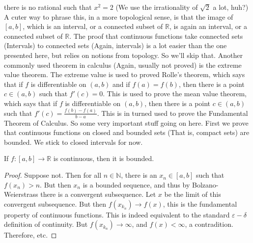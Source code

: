 \documentclass[crop=false,class=article,oneside]{standalone}
\begin{document}
            there is no rational such that $x^{2}=2$
            (We use the irrationality of $\sqrt{2}$ a lot, huh?)
            A cuter way to phrase this, in a more topological
            sense, is that the image of $[a,b]$, which is an
            interval, or a connected subset of $\mathbb{R}$,
            is again an interval, or a connected subset of
            $\mathbb{R}$. The proof that continuous functions take
            connected sets (Intervals) to connected sets
            (Again, intervals) is a lot easier than the one presented
            here, but relies on notions from topology.
            So we'll skip that.
            Another commonly used theorem in calculus
            (Again, usually not proved) is the extreme value theorem.
            The extreme value is used to proved Rolle's theorem,
            which says that if $f$ is differentiable on $(a,b)$
            and if $f(a)=f(b)$, then there is a point
            $c\in(a,b)$ such that $f'(c)=0$. This is used to
            prove the mean value theorem, which says that
            if $f$ is differentiable on $(a,b)$, then there is a point
            $c\in(a,b)$ such that
            $f'(c)=\frac{f(b)-f(a)}{b-a}$. This is in turned used to
            prove the Fundamental Theorem of Calculus. So some very
            important stuff going on here. First we prove that
            continuous functions on closed and bounded sets (That is,
            compact sets) are bounded. We stick to closed intervals
            for now.
            \begin{theorem}
                If $f:[a,b]\rightarrow\mathbb{R}$ is continuous,
                then it is bounded.
            \end{theorem}
            \begin{proof}
                Suppose not. Then for all $n\in\mathbb{N}$, there is
                an $x_{n}\in[a,b]$ such that $f(x_{n})>n$. But then
                $x_{n}$ is a bounded sequence, and thus by
                Bolzano-Weierstrass there is a convergent subsequence.
                Let $x$ be the limit of this convergent subsequence.
                But then $f(x_{k_{n}})\rightarrow{f(x)}$, this is
                the fundamental property of continuous functions.
                This is indeed equivalent to the standard
                $\varepsilon-\delta$ definition of continuity.
                But $f(x_{k_{n}})\rightarrow\infty$, and $f(x)<\infty$,
                a contradition. Therefore, etc.
            \end{proof}
\end{document}
